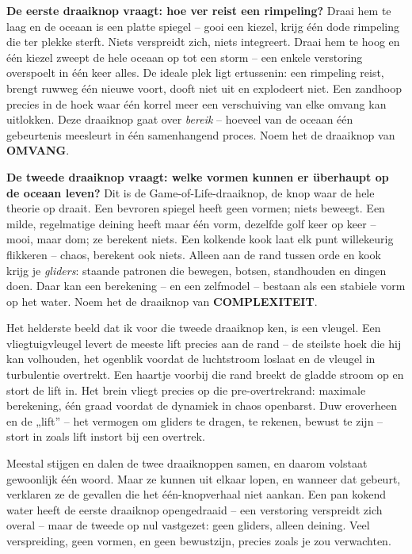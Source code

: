 \documentclass[11pt, twoside, openright]{book}
\begin{document}
\textbf{De eerste draaiknop vraagt: hoe ver reist een rimpeling?} Draai hem te laag en de oceaan is een platte spiegel -- gooi een kiezel, krijg één dode rimpeling die ter plekke sterft. Niets verspreidt zich, niets integreert. Draai hem te hoog en één kiezel zweept de hele oceaan op tot een storm -- een enkele verstoring overspoelt in één keer alles. De ideale plek ligt ertussenin: een rimpeling reist, brengt ruwweg één nieuwe voort, dooft niet uit en explodeert niet. Een zandhoop precies in de hoek waar één korrel meer een verschuiving van elke omvang kan uitlokken. Deze draaiknop gaat over \textit{bereik} -- hoeveel van de oceaan één gebeurtenis meesleurt in één samenhangend proces. Noem het de draaiknop van \textbf{OMVANG}.

\textbf{De tweede draaiknop vraagt: welke vormen kunnen er überhaupt op de oceaan leven?} Dit is de Game-of-Life-draaiknop, de knop waar de hele theorie op draait. Een bevroren spiegel heeft geen vormen; niets beweegt. Een milde, regelmatige deining heeft maar één vorm, dezelfde golf keer op keer -- mooi, maar dom; ze berekent niets. Een kolkende kook laat elk punt willekeurig flikkeren -- chaos, berekent ook niets. Alleen aan de rand tussen orde en kook krijg je \textit{gliders}: staande patronen die bewegen, botsen, standhouden en dingen doen. Daar kan een berekening -- en een zelfmodel -- bestaan als een stabiele vorm op het water. Noem het de draaiknop van \textbf{COMPLEXITEIT}.

Het helderste beeld dat ik voor die tweede draaiknop ken, is een vleugel. Een vliegtuigvleugel levert de meeste lift precies aan de rand -- de steilste hoek die hij kan volhouden, het ogenblik voordat de luchtstroom loslaat en de vleugel in turbulentie overtrekt. Een haartje voorbij die rand breekt de gladde stroom op en stort de lift in. Het brein vliegt precies op die pre-overtrekrand: maximale berekening, één graad voordat de dynamiek in chaos openbarst. Duw eroverheen en de „lift” -- het vermogen om gliders te dragen, te rekenen, bewust te zijn -- stort in zoals lift instort bij een overtrek.

Meestal stijgen en dalen de twee draaiknoppen samen, en daarom volstaat gewoonlijk één woord. Maar ze kunnen uit elkaar lopen, en wanneer dat gebeurt, verklaren ze de gevallen die het één-knopverhaal niet aankan. Een pan kokend water heeft de eerste draaiknop opengedraaid -- een verstoring verspreidt zich overal -- maar de tweede op nul vastgezet: geen gliders, alleen deining. Veel verspreiding, geen vormen, en geen bewustzijn, precies zoals je zou verwachten.
\end{document}
